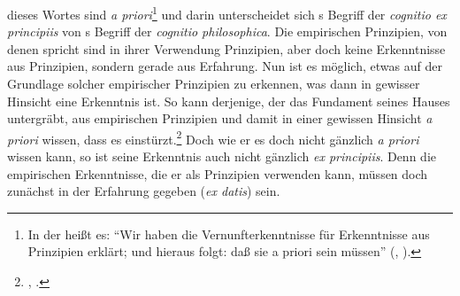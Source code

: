 dieses Wortes sind \emph{a priori}\footnote{In der  heißt
es: \enquote{Wir haben die Vernunfterkenntnisse für Erkenntnisse aus Prinzipien
erklärt; und hieraus folgt: daß sie a priori sein müssen}
\mkbibparens{\cite[][A~21]{Kant:ImmanuelKantsLogik1977}, \cite[][IX:
22.33--34]{Kant:GesammelteWerke1900ff.}}.} und darin unterscheidet sich
s Begriff der \emph{cognitio ex principiis} von
s Begriff der \emph{cognitio
philosophica}. Die empirischen Prinzipien, von denen 
spricht sind in ihrer Verwendung Prinzipien, aber doch keine Erkenntnisse aus
Prinzipien, sondern gerade aus Erfahrung. Nun ist es möglich, etwas auf der
Grundlage solcher empirischer Prinzipien zu erkennen, was dann in gewisser
Hinsicht eine Erkenntnis  ist.
So kann derjenige, der das Fundament seines Hauses untergräbt, aus empirischen
Prinzipien und damit in einer gewissen Hinsicht \emph{a priori} wissen, dass es
einstürzt.\footnote{\cite[Siehe hierzu][B 2]{Kant:KritikderreinenVernunft2003},
\cite[][III: 28.7--18]{Kant:GesammelteWerke1900ff.}.} Doch wie er es doch nicht
gänzlich \emph{a priori} wissen kann, so ist seine Erkenntnis auch nicht
gänzlich \emph{ex principiis}. Denn die empirischen Erkenntnisse, die er als
Prinzipien verwenden kann, müssen doch zunächst in der Erfahrung gegeben
(\emph{ex datis}) sein.

